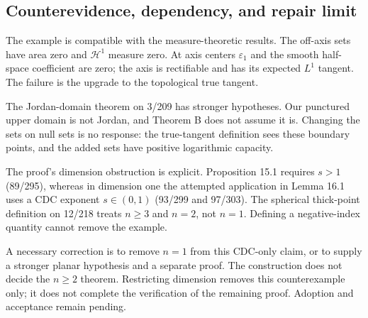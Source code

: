 \documentclass[10pt]{article}
\begin{document}
\subsection*{Counterevidence, dependency, and repair limit}
The example is compatible with the measure-theoretic results. The off-axis sets have area zero and \(\mathcal H^1\) measure zero. At axis centers \(\varepsilon_1\) and the smooth half-space coefficient are zero; the axis is rectifiable and has its expected \(L^1\) tangent. The failure is the upgrade to the topological true tangent.\par
The Jordan-domain theorem on 3/209 has stronger hypotheses. Our punctured upper domain is not Jordan, and Theorem B does not assume it is. Changing the sets on null sets is no response: the true-tangent definition sees these boundary points, and the added sets have positive logarithmic capacity.\par
The proof’s dimension obstruction is explicit. Proposition 15.1 requires \(s>1\) (89/295), whereas in dimension one the attempted application in Lemma 16.1 uses a CDC exponent \(s\in(0,1)\) (93/299 and 97/303). The spherical thick-point definition on 12/218 treats \(n\ge3\) and \(n=2\), not \(n=1\). Defining a negative-index quantity cannot remove the example.\par
A necessary correction is to remove \(n=1\) from this CDC-only claim, or to supply a stronger planar hypothesis and a separate proof. The construction does not decide the \(n\ge2\) theorem. Restricting dimension removes this counterexample only; it does not complete the verification of the remaining proof. Adoption and acceptance remain pending.\par
\end{document}
